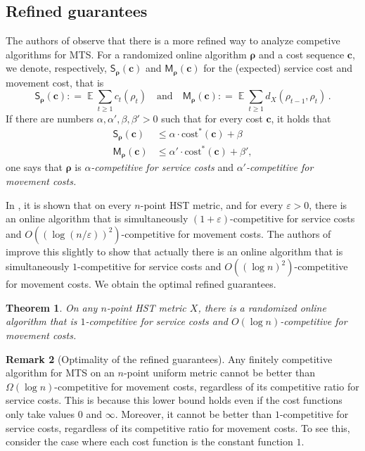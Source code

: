 \documentclass[11pt]{article}
\numberwithin{equation}{section}
\newtheorem{theorem}{Theorem}[section]
\theoremstyle{definition}
\newtheorem{remark}[theorem]{Remark}
\theoremstyle{plain}
\newcommand{\cost}{\mathrm{cost}}
\newcommand{\eps}{\varepsilon}
\newcommand{\mcost}{\mathsf{M}}
\newcommand{\scost}{\mathsf{S}}
\newcommand{\seteq}{\mathrel{\mathop:}=}
\DeclareMathOperator*{\Exp}{\mathbb{E}}
\begin{document}
\subsection{Refined guarantees}

The authors of \cite{BBN10} observe that there is a more refined way to analyze
competive algorithms for MTS.
For a randomized online algorithm $\bm{\rho}$ and a cost sequence $\bm{c}$, we denote, respectively, $\scost_{\bm{\rho}}(\bm{c})$
and $\mcost_{\bm{\rho}}(\bm{c})$ for the (expected) service cost and movement cost, that is
\[
\scost_{\bm{\rho}}(\bm{c}) \seteq \Exp \sum_{t \geq 1} c_t(\rho_t) \quad \text{and}\quad \mcost_{\bm{\rho}}(\bm{c}) \seteq \Exp \sum_{t\geq1}d_X(\rho_{t-1}, \rho_t) \,.
\]
If there are numbers $\alpha,\alpha',\beta,\beta' > 0$ such that
for every cost $\bm{c}$, it holds that
\begin{align*}
\scost_{\bm\rho}(\bm{c}) &\leq \alpha \cdot \cost^*(\bm{c})+\beta \\
\mcost_{\bm\rho}(\bm{c}) &\leq \alpha' \cdot \cost^*(\bm{c})+\beta',
\end{align*}
one says that $\bm{\rho}$ is \emph{$\alpha$-competitive for service costs} and \emph{$\alpha'$-competitive for movement costs.}

In \cite{BBN10}, it is shown that on every $n$-point HST metric, and
for every $\eps > 0$, there is an online algorithm that is simultaneously
$(1+\eps)$-competitive for service costs and $O((\log (n/\eps))^2)$-competitive for movement costs.
The authors of \cite{BCLL19} improve this slightly to show that actually
there is an online algorithm that is simultaneously $1$-competitive for service costs
and $O((\log n)^2)$-competitive for movement costs.
We obtain the optimal refined guarantees.

\begin{theorem} \label{thm:refined}
	On any $n$-point HST metric $X$, there
	is a randomized  online algorithm that is $1$-competitive for service costs and $O(\log n)$-competitive for movement costs.
\end{theorem}

\begin{remark}[Optimality of the refined guarantees]
	Any finitely competitive algorithm for MTS on an $n$-point uniform metric
	cannot be better than $\Omega(\log n)$-competitive for movement costs,
	regardless of its competitive ratio for service costs. This is because this lower bound holds even if the cost functions only take values $0$ and $\infty$. Moreover, it cannot be better than $1$-competitive for service costs, regardless of its competitive ratio for movement costs. To see this, consider the case where each cost function is the constant function $1$.
\end{remark}
\end{document}

